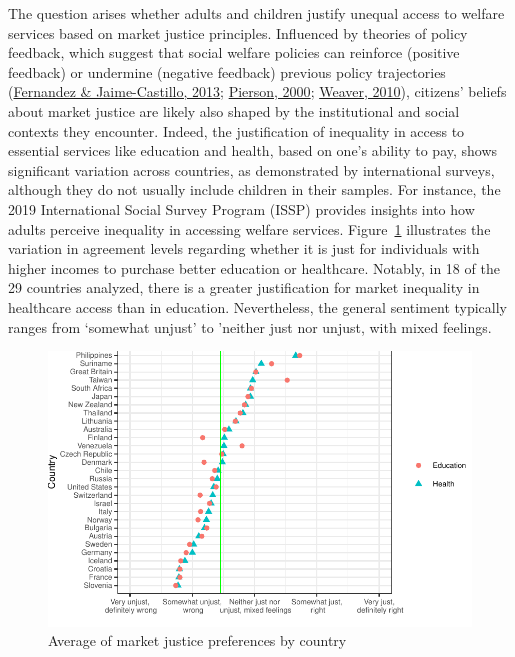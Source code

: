\documentclass[
  letterpaper,
  DIV=11,
  numbers=noendperiod]{scrartcl}
\begin{document}
The question arises whether adults and children justify unequal access
to welfare services based on market justice principles. Influenced by
theories of policy feedback, which suggest that social welfare policies
can reinforce (positive feedback) or undermine (negative feedback)
previous policy trajectories
(\protect\hyperlink{ref-fernandez_positive_2013}{Fernandez \&
Jaime-Castillo, 2013};
\protect\hyperlink{ref-pierson_increasing_2000}{Pierson, 2000};
\protect\hyperlink{ref-weaver_paths_2010}{Weaver, 2010}), citizens'
beliefs about market justice are likely also shaped by the institutional
and social contexts they encounter. Indeed, the justification of
inequality in access to essential services like education and health,
based on one's ability to pay, shows significant variation across
countries, as demonstrated by international surveys, although they do
not usually include children in their samples. For instance, the 2019
International Social Survey Program (ISSP) provides insights into how
adults perceive inequality in accessing welfare services.
Figure~\ref{fig-issp} illustrates the variation in agreement levels
regarding whether it is just for individuals with higher incomes to
purchase better education or healthcare. Notably, in 18 of the 29
countries analyzed, there is a greater justification for market
inequality in healthcare access than in education. Nevertheless, the
general sentiment typically ranges from `somewhat unjust' to 'neither
just nor unjust, with mixed feelings.

\begin{figure}

{\centering \includegraphics{paper_files/figure-pdf/fig-issp-1.pdf}

}

\caption{\label{fig-issp}Average of market justice preferences by
country}

\end{figure}
\end{document}
